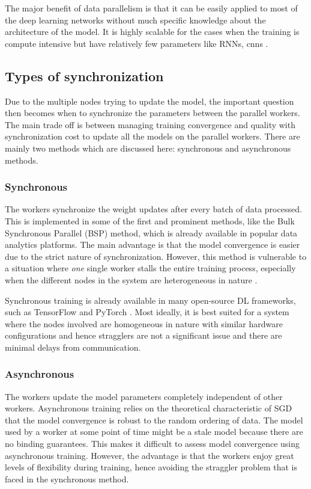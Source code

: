The major benefit of data parallelism is that it can be easily applied to most of the deep learning networks without much specific knowledge about the architecture of the model. It is highly scalable for the cases when the training is compute intensive but have relatively few parameters like RNNs, \acrshort{cnn}s \cite{Krizhevsky2014OneNetworks}.


\subsection{Types of synchronization}
Due to the multiple nodes trying to update the model, the important question then becomes when to synchronize the parameters between the parallel workers. The main trade off is between managing training convergence and quality with synchronization cost to update all the models on the parallel workers. There are mainly two methods which are discussed here: synchronous and asynchronous methods.

\subsubsection{Synchronous}
The workers synchronize the weight updates after every batch of data processed. This is implemented in some of the first and prominent methods, like the Bulk Synchronous Parallel (BSP) \cite{Valiant1990AComputation} method, which is already available in popular data analytics platforms. The main advantage is that the model convergence is easier due to the strict nature of synchronization. However, this method is vulnerable to a situation where \emph{one} single worker stalls the entire training process, especially when the different nodes in the system are heterogeneous in nature \cite{Cipar2013SolvingStaleness}.

Synchronous training is already available in many open-source DL frameworks, such
as TensorFlow \cite{Abadi2016TensorFlow:Systems} and PyTorch \cite{Paszke2019PyTorch:Library}. Most ideally, it is best suited for a system where the nodes involved are homogeneous in nature with similar hardware configurations and hence stragglers are not a significant issue and there are minimal delays from communication.

\subsubsection{Asynchronous}
\label{section:hogwild}
The workers update the model parameters completely independent of other workers. Asynchronous training relies on the theoretical characteristic of SGD that the model convergence is robust to the random ordering of data. The model used by a worker at some point of time might be a stale model because there are no binding guarantees. This makes it difficult to assess model convergence using asynchronous training. However, the advantage is that the workers enjoy great levels of flexibility during training, hence avoiding the straggler problem that is faced in the synchronous method.


